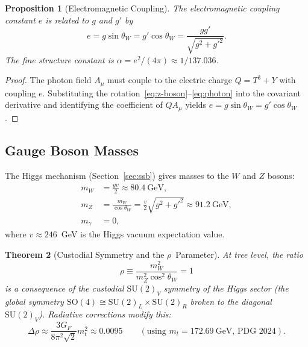 \documentclass[12pt]{article}
\newtheorem{theorem}{Theorem}[section]
\newtheorem{proposition}[theorem]{Proposition}
\theoremstyle{definition}
\theoremstyle{remark}
\newcommand{\su}[1]{\mathrm{SU}(#1)}
\newcommand{\cosw}{\cos\theta_W}
\begin{document}
\begin{proposition}[Electromagnetic Coupling]
\label{prop:em-coupling}
The electromagnetic coupling constant $e$ is related to $g$ and $g'$ by
\begin{equation}
\label{eq:em-coupling}
e = g \sin\theta_W = g' \cosw = \frac{g g'}{\sqrt{g^2 + g'^2}}.
\end{equation}
The fine structure constant is $\alpha = e^2/(4\pi) \approx 1/137.036$.
\end{proposition}

\begin{proof}
The photon field $A_\mu$ must couple to the electric charge $Q = T^3 + Y$ with coupling $e$. Substituting the rotation~\eqref{eq:z-boson}--\eqref{eq:photon} into the covariant derivative and identifying the coefficient of $Q A_\mu$ yields $e = g \sin\theta_W = g' \cosw$.
\end{proof}

\subsection{Gauge Boson Masses}

The Higgs mechanism (Section~\ref{sec:ssb}) gives masses to the $W$ and $Z$ bosons:
\begin{align}
m_W &= \frac{g v}{2} \approx 80.4~\text{GeV}, \label{eq:mw} \\
m_Z &= \frac{m_W}{\cosw} = \frac{v}{2}\sqrt{g^2 + g'^2} \approx 91.2~\text{GeV}, \label{eq:mz} \\
m_\gamma &= 0, \label{eq:mphoton}
\end{align}
where $v \approx 246$~GeV is the Higgs vacuum expectation value.

\begin{theorem}[Custodial Symmetry and the $\rho$~Parameter]
\label{thm:rho-parameter}
At tree level, the ratio
\begin{equation}
\label{eq:rho}
\rho \equiv \frac{m_W^2}{m_Z^2 \cos^2\!\theta_W} = 1
\end{equation}
is a consequence of the custodial $\su{2}_V$ symmetry of the Higgs sector (the global symmetry $\mathrm{SO}(4) \cong \su{2}_L \times \su{2}_R$ broken to the diagonal $\su{2}_V$). Radiative corrections modify this:
\begin{equation}
\label{eq:delta-rho}
\Delta\rho \approx \frac{3 G_F}{8\pi^2 \sqrt{2}} m_t^2 \approx 0.0095 \qquad (\text{using } m_t = 172.69~\text{GeV, PDG 2024}).
\end{equation}
\end{theorem}
\end{document}
